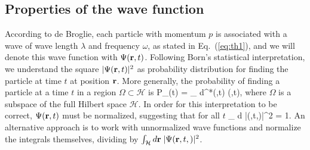 \subsection{Properties of the  wave function}
According to de Broglie, each particle with momentum $p$ is associated with a wave of wave length $\lambda$ and frequency $\omega$, as stated in Eq.~(\ref{eq:th1}), and we will denote this wave function with $\Psi(\mathbf{r},t)$. Following Born's statistical interpretation, we understand the square $|\Psi(\mathbf{r},t)|^2$ as probability distribution for finding the particle at time $t$ at position $\mathbf{r}$. More generally, the probability of finding a particle at a time $t$ in a region $\Omega\subset\mathcal{H}$ is 
\be 
P_{\Omega}(t) = \int_{\Omega} d\rv\Psi^*(\rv,t) \Psi(\rv,t),
\label{eq:th8}
\ee
where $\Omega$ is a subspace of the full Hilbert space $\mathcal{H}$. In order for this interpretation to be correct, $\Psi(\mathbf{r},t)$ must be normalized, suggesting that for all $t$
\be 
\int_{} d\rv\; |\Psi(\rv,t,)|^2 = 1.
\label{eq:th9}
\ee
An alternative approach is to work with unnormalized wave functions and normalize the integrals themselves, dividing by $\int_{\mathcal{H}} d\mathbf{r}\; |\Psi(\mathbf{r},t,)|^2$.


